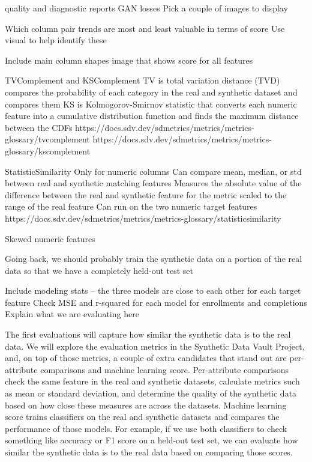 \documentclass[sigconf, authorversion, nonacm]{acmart}
\begin{document}
    quality and diagnostic reports
    GAN losses
    Pick a couple of images to display

    Which column pair trends are most and least valuable in terms of score
    Use visual to help identify these

    Include main column shapes image that shows score for all features

    TVComplement and KSComplement
    TV is total variation distance (TVD) compares the probability of each category in the real and synthetic dataset and compares them
    KS is Kolmogorov-Smirnov statistic that converts each numeric feature into a cumulative distribution function and finds the maximum distance between the CDFs
    https://docs.sdv.dev/sdmetrics/metrics/metrics-glossary/tvcomplement
    https://docs.sdv.dev/sdmetrics/metrics/metrics-glossary/kscomplement

    StatisticSimilarity
    Only for numeric columns
    Can compare mean, median, or std between real and synthetic matching features
    Measures the absolute value of the difference between the real and synthetic feature for the metric scaled to the range of the real feature
    Can run on the two numeric target features
    https://docs.sdv.dev/sdmetrics/metrics/metrics-glossary/statisticsimilarity

    Skewed numeric features

    Going back, we should probably train the synthetic data on a portion of the real data so that we have a completely held-out test set

    Include modeling stats -- the three models are close to each other for each target feature
    Check MSE and r-squared for each model for enrollments and completions
    Explain what we are evaluating here







    The first evaluations will capture how similar the synthetic data is to the real data. We will explore the evaluation metrics in the Synthetic Data Vault Project, and, on top of those metrics, a couple of extra candidates that stand out are per-attribute comparisons and machine learning score. Per-attribute comparisons check the same feature in the real and synthetic datasets, calculate metrics such as mean or standard deviation, and determine the quality of the synthetic data based on how close these measures are across the datasets. Machine learning score trains classifiers on the real and synthetic datasets and compares the performance of those models. For example, if we use both classifiers to check something like accuracy or F1 score on a held-out test set, we can evaluate how similar the synthetic data is to the real data based on comparing those scores.
\end{document}
